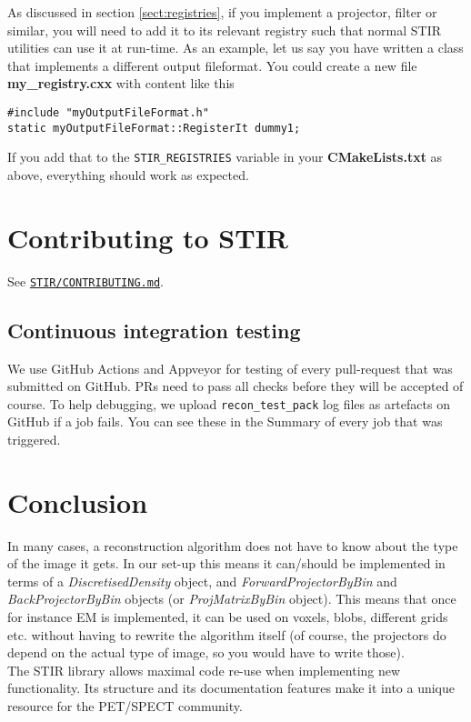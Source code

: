 \documentclass{article}
\def\R2Lurl#1#2{\mbox{\href{#1}{\tt #2}}}
\begin{document}
As discussed in section \ref{sect:registries}, if you implement a projector, filter
or similar, you will need to add it to its relevant registry
such that normal STIR utilities can use it at run-time.
As an example, let us say you have written a class that implements
a different output fileformat. You could create a new file \textbf{my\_registry.cxx} with
content like this
\begin{verbatim}
#include "myOutputFileFormat.h"
static myOutputFileFormat::RegisterIt dummy1;
\end{verbatim}
If you add that to the \texttt{STIR\_REGISTRIES} variable in your \textbf{CMakeLists.txt}
as above, everything should work as expected.

\section{Contributing to STIR}
See
\R2Lurl{https://github.com/UCL/STIR/blob/master/CONTRIBUTING.md}{STIR/CONTRIBUTING.md}.

\subsection{Continuous integration testing}
We use GitHub Actions and Appveyor for testing of every pull-request that was submitted on GitHub. PRs
need to pass all checks before they will be accepted of course.
To help debugging, we upload \texttt{recon\_test\_pack} log files as artefacts on
GitHub if a job fails. You can see these in the Summary of every job that was triggered.

\section{
Conclusion}

In many cases, a reconstruction algorithm does not have to know 
about the type of the image it gets. In our set-up this means 
it can/should be implemented in terms of a \textit{DiscretisedDensity} 
object, and \textit{ForwardProjectorByBin} and \textit{BackProjectorByBin} 
objects (or \textit{ProjMatrixByBin} object). This means that once 
for instance EM is implemented, it can be used on voxels, blobs, 
different grids etc. without having to rewrite the algorithm 
itself (of course, the projectors do depend on the actual type 
of image, so you would have to write those).\\
The STIR library allows maximal code re-use when implementing 
new functionality. Its structure and its documentation features 
make it into a unique resource for the PET/SPECT community. 
\end{document}
